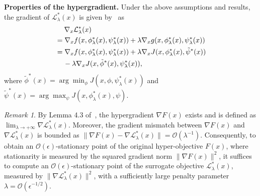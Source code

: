 \documentclass{article}
\theoremstyle{plain}
\theoremstyle{definition}
\theoremstyle{remark}
\newtheorem{remark}{Remark}
\def\cL{\mathcal L}
\def\cO{\mathcal O}
\begin{document}


\vspace{-2mm}
{\bf Properties of the hypergradient.} 
Under the above assumptions and results, the gradient of $\mathcal{L}_\lambda^*(x)$ is given by~\citet{chen2024finding} as
\vspace{-2mm}
\begin{align}
    & \quad\;\nabla_x \mathcal{L}_\lambda^*(x) 
    \notag 
    \\\notag
    & =  \nabla_x f(x,\phi^*_\lambda(x),\psi^*_\lambda(x))  + \lambda \nabla_x g(x,\phi^*_\lambda(x),\psi^*_\lambda(x)) \\
    & = \nabla_x f(x,\phi^*_\lambda(x),\psi^*_\lambda(x)) + \lambda \nabla_x J(x,\phi^*_\lambda(x),\tilde{\psi}^*(x)) \notag \\
    & \quad \, - \lambda \nabla_x J(x,\tilde{\phi}^*(x),\psi_\lambda^*(x)), \label{eq: gradient-hyper-objective}
    \vspace{-2mm}
\end{align}
where $\tilde{\phi}^*(x) = \arg\min_\phi J(x,\phi,\psi_\lambda^*(x))$ and $\tilde{\psi}^*(x) = \arg\max_\psi J(x,\phi_\lambda^*(x),\psi)$. 
\begin{remark}
 By Lemma 4.3 of~\citet{chen2024finding}, the hypergradient $\nabla F(x)$ exists and is defined as $\lim_{\lambda \to + \infty} \nabla \cL_{\lambda}^*(x)$. Moreover, the gradient mismatch between $\nabla F(x)$ and $\nabla \mathcal{L}_\lambda^*(x)$ is bounded as $\|\nabla F(x) - \nabla \mathcal{L}_\lambda^*(x) \| = \cO(\lambda^{-1})$. Consequently, to obtain an $\cO(\epsilon)$-stationary point of the original hyper-objective $F(x)$, where stationarity is measured by the squared gradient norm $\|\nabla F(x)\|^2$, it suffices to compute an $\cO(\epsilon)$-stationary point of the surrogate objective $\mathcal{L}_\lambda^*(x)$, measured by $\|\nabla \mathcal{L}_\lambda^*(x)\|^2$, with a sufficiently large penalty parameter $\lambda = \cO(\epsilon^{-1/2})$.
\end{remark}
\end{document}

